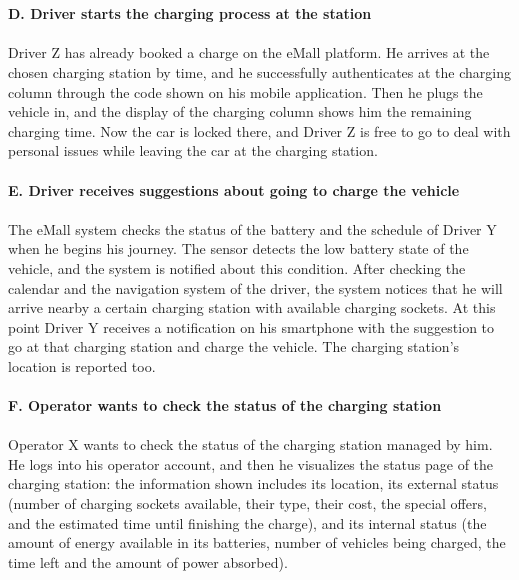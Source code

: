 \documentclass[../main.tex]{subfiles}
\begin{document}
\vspace{2em}
\\
\\
\textbf{D. Driver starts the charging process at the station}
\vspace{-0.7em}
\\
\\
Driver Z has already booked a charge on the eMall platform. He arrives at the chosen charging station by time, and he successfully authenticates at the charging column through the code shown on his mobile application. Then he plugs the vehicle in, and the display of the charging column shows him the remaining charging time. Now the car is locked there, and Driver Z is free to go to deal with personal issues while leaving the car at the charging station.
\vspace{2em}
\\
\\
\textbf{E. Driver receives suggestions about going to charge the vehicle}
\vspace{-0.7em}
\\
\\
The eMall system checks the status of the battery and the schedule of Driver Y when he begins his journey. The sensor detects the low battery state of the vehicle, and the system is notified about this condition. After checking the calendar and the navigation system of the driver, the system notices that he will arrive nearby a certain charging station with available charging sockets. At this point Driver Y receives a notification on his smartphone with the suggestion to go at that charging station and charge the vehicle. The charging station's location is reported too.
\vspace{2em}
\\
\\
\textbf{F. Operator wants to check the status of the charging station}
\vspace{-0.7em}
\\
\\
Operator X wants to check the status of the charging station managed by him. He logs into his operator account, and then he visualizes the status page of the charging station: the information shown includes its location, its external status (number of charging sockets available, their type, their cost, the special offers, and the estimated time until finishing the charge), and its internal status (the amount of energy available in its batteries, number of vehicles being charged, the time left and the amount of power absorbed).
\end{document}
